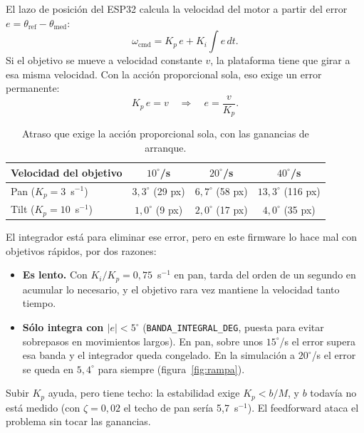 \documentclass[11pt,a4paper]{article}
\newcommand{\cod}[1]{\texttt{#1}}
\newcommand{\gr}{^{\circ}}
\begin{document}
El lazo de posición del ESP32 calcula la velocidad del motor a partir del error $e = \theta_{\mathrm{ref}} - \theta_{\mathrm{med}}$:
\begin{equation}
  \omega_{\mathrm{cmd}} = K_p\, e + K_i \int e \, dt .
  \label{eq:pi}
\end{equation}
Si el objetivo se mueve a velocidad constante $v$, la plataforma tiene que girar a esa misma velocidad. Con la
acción proporcional sola, eso exige un error permanente:
\begin{equation}
  K_p\, e = v \quad\Longrightarrow\quad e = \frac{v}{K_p}.
\end{equation}

\begin{table}[H]
\centering\small
\caption{Atraso que exige la acción proporcional sola, con las ganancias de arranque.}
\begin{tabular}{@{}lccc@{}}
\toprule
Velocidad del objetivo & $10\gr$/s & $20\gr$/s & $40\gr$/s \\
\midrule
Pan ($K_p = 3$~s$^{-1}$)   & $3{,}3\gr$ (29 px) & $6{,}7\gr$ (58 px) & $13{,}3\gr$ (116 px) \\
Tilt ($K_p = 10$~s$^{-1}$) & $1{,}0\gr$ (9 px)  & $2{,}0\gr$ (17 px) & $4{,}0\gr$ (35 px) \\
\bottomrule
\end{tabular}
\end{table}

El integrador está para eliminar ese error, pero en este firmware lo hace mal con objetivos rápidos, por dos
razones:
\begin{itemize}
  \item \textbf{Es lento.} Con $K_i/K_p = 0{,}75$~s$^{-1}$ en pan, tarda del orden de un segundo en acumular lo
        necesario, y el objetivo rara vez mantiene la velocidad tanto tiempo.
  \item \textbf{Sólo integra con $|e| < 5\gr$} (\cod{BANDA\_INTEGRAL\_DEG}, puesta para evitar sobrepasos en
        movimientos largos). En pan, sobre unos $15\gr$/s el error supera esa banda y el integrador queda
        congelado. En la simulación a $20\gr$/s el error se queda en $5{,}4\gr$ para siempre
        (figura~\ref{fig:rampa}).
\end{itemize}

Subir $K_p$ ayuda, pero tiene techo: la estabilidad exige $K_p < b/M$, y $b$ todavía no está medido (con
$\zeta = 0{,}02$ el techo de pan sería 5,7~s$^{-1}$). El feedforward ataca el problema sin tocar las ganancias.
\end{document}
